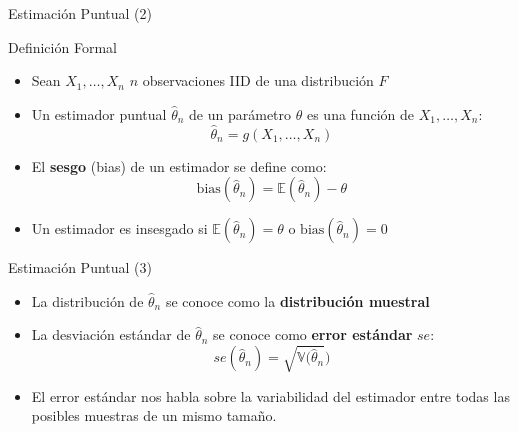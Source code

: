 \documentclass[handout]{beamer}
\begin{document}
\begin{frame}{Estimación Puntual (2)}

\scriptsize{
\begin{block}{Definición Formal}
\begin{itemize}
 \item Sean $X_1, \dots, X_n$ $n$ observaciones IID de una distribución $F$
 \item Un estimador puntual $\hat{\theta}_n$  de un parámetro $\theta$ es una función de $X_1, \dots, X_n$:
 \begin{displaymath}
 \hat{\theta}_n=g(X_1, \dots, X_n) 
 \end{displaymath}
 
\end{itemize}

 
\end{block}

\begin{itemize}
 \item El \textbf{sesgo} (bias) de un estimador se define como: 
\begin{displaymath}
 \text{bias}(\hat{\theta}_n)=\mathbb{E}(\hat{\theta}_n)-\theta
\end{displaymath}
\item Un estimador es insesgado si $\mathbb{E}(\hat{\theta}_n)=\theta$ o  $\text{bias}(\hat{\theta}_n)=0 $
\end{itemize}

} 
\end{frame}


\begin{frame}{Estimación Puntual (3)}

\scriptsize{

\begin{itemize}
\item La distribución de $\hat{\theta}_n$ se conoce como la \textbf{distribución muestral}
\item La desviación estándar de $\hat{\theta}_n$ se conoce como \textbf{error estándar} $se$:
\begin{displaymath}
se(\hat{\theta}_n)=\sqrt{\mathbb{V}(\hat{\theta}_n})
\end{displaymath}
\item El error estándar nos habla sobre la variabilidad del estimador entre todas las posibles muestras de un mismo tamaño.
\end{itemize}

} 
\end{frame}
\end{document}
